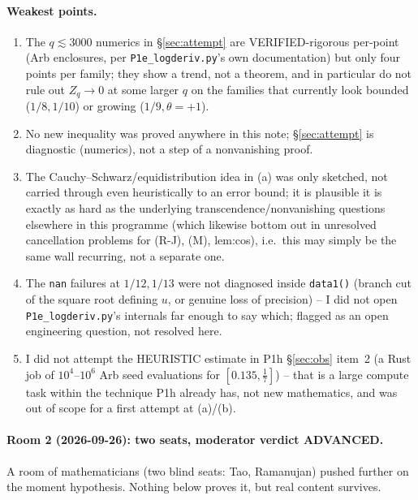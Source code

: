 \documentclass[11pt]{article}
\theoremstyle{remark}\newtheorem{remark}[theorem]{Remark}
\begin{document}
\paragraph{Weakest points.}
\begin{enumerate}
\item The $q\lesssim3000$ numerics in \S\ref{sec:attempt} are VERIFIED-rigorous per-point (Arb enclosures, per \texttt{P1e\_logderiv.py}'s own documentation) but only four points per family; they show a trend, not a theorem, and in particular do not rule out $Z_q\to0$ at some larger $q$ on the families that currently look bounded ($1/8,1/10$) or growing ($1/9,\theta{=}+1$).
\item No new inequality was proved anywhere in this note; \S\ref{sec:attempt} is diagnostic (numerics), not a step of a nonvanishing proof.
\item The Cauchy--Schwarz/equidistribution idea in (a) was only sketched, not carried through even heuristically to an error bound; it is plausible it is exactly as hard as the underlying transcendence/nonvanishing questions elsewhere in this programme (which likewise bottom out in unresolved cancellation problems for (R-J), (M), lem:cos), i.e.\ this may simply be the same wall recurring, not a separate one.
\item The \texttt{nan} failures at $1/12,1/13$ were not diagnosed inside \texttt{data1()} (branch cut of the square root defining $u$, or genuine loss of precision) -- I did not open \texttt{P1e\_logderiv.py}'s internals far enough to say which; flagged as an open engineering question, not resolved here.
\item I did not attempt the HEURISTIC estimate in P1h \S\ref{sec:obs} item~2 (a Rust job of $10^4$--$10^6$ Arb seed evaluations for $[0.135,\frac17]$) -- that is a large compute task within the technique P1h already has, not new mathematics, and was out of scope for a first attempt at (a)/(b).
\end{enumerate}

\paragraph{Room 2 (2026-09-26): two seats, moderator verdict ADVANCED.}
A room of mathematicians (two blind seats: Tao, Ramanujan) pushed further on the moment
hypothesis. Nothing below proves it, but real content survives.
\end{document}

